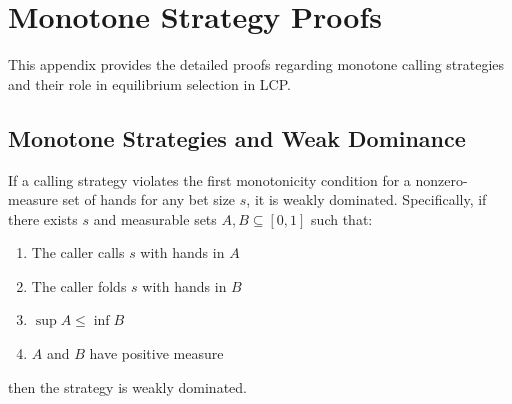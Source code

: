 \documentclass[../../main/main.tex]{subfiles}
\begin{document}
\section{Monotone Strategy Proofs}
\label{sec:monotone_proofs}

This appendix provides the detailed proofs regarding monotone calling strategies and their role in equilibrium selection in LCP.

\subsection{Monotone Strategies and Weak Dominance}

\begin{lemma}
    \label{lem:monotone_dominated}
    If a calling strategy violates the first monotonicity condition for a nonzero-measure set of hands for any bet size $s$, it is weakly dominated. Specifically, if there exists $s$ and measurable sets $A, B \subseteq [0, 1]$ such that:
    \begin{enumerate}
        \item The caller calls $s$ with hands in $A$
        \item The caller folds $s$ with hands in $B$
        \item $\sup A \leq \inf B$
        \item $A$ and $B$ have positive measure
    \end{enumerate}
    then the strategy is weakly dominated.
\end{lemma}
\end{document}
